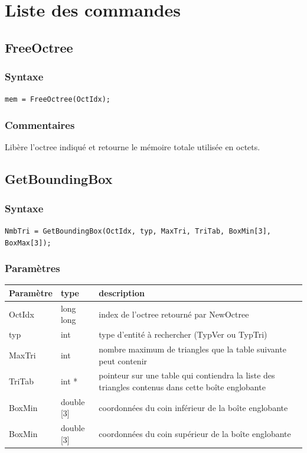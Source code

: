 \documentclass[a4paper,12pt]{article}
\begin{document}
%
%

\newpage
\section{Liste des commandes}


\subsection{FreeOctree}

\subsubsection*{Syntaxe}
{\tt mem = FreeOctree(OctIdx);}

\subsubsection*{Commentaires}
Libère l'octree indiqué et retourne le mémoire totale utilisée en octets.



\newpage
\subsection{GetBoundingBox}
\subsubsection*{Syntaxe}
{\tt NmbTri = GetBoundingBox(OctIdx, typ, MaxTri, TriTab, BoxMin[3], BoxMax[3]);}
\subsubsection*{Paramètres}

\begin{tabular}{|m{3cm}|m{2cm}|m{8.5cm}|}
\hline
Paramètre  & type      & description \\
\hline
OctIdx     & long long & index de l'octree retourné par NewOctree \\
\hline
typ        & int       & type d'entité à rechercher (TypVer ou TypTri) \\
\hline
MaxTri     & int       & nombre maximum de triangles que la table suivante peut contenir \\
\hline
TriTab     & int *     & pointeur sur une table qui contiendra la liste des triangles contenus dans cette boîte englobante \\
\hline
BoxMin     & double [3] & coordonnées du coin inférieur de la boîte englobante \\
\hline
BoxMin     & double [3] & coordonnées du coin supérieur de la boîte englobante \\
\hline
\end{tabular}
\end{document}

